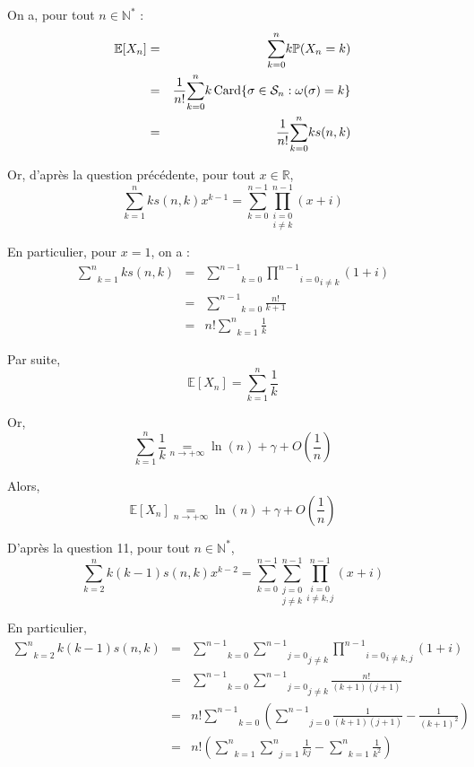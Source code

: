  On a, pour tout $n \in \mathbb{N}^{\ast}$ :
\begin{eqnarray*}
  \mathbb{E} [X_n] & = & \underset{k = 0}{\overset{n}{\sum}} k\mathbb{P} (X_n
  = k)\\
  & = & \frac{1}{n!} \underset{k = 0}{\overset{n}{\sum}} k \operatorname{Card} \{
  \sigma \in \mathcal{S}_n : \omega (\sigma) = k \}\\
  & = & \frac{1}{n!} \underset{k = 0}{\overset{n}{\sum}} k s (n, k)
\end{eqnarray*}


Or, d'apr{\`e}s la question pr{\'e}c{\'e}dente, pour tout $x \in \mathbb{R}$,
\[ \underset{k = 1}{\overset{n}{\sum}} k s (n, k) x^{k - 1} = \underset{k =
   0}{\overset{n - 1}{\sum}} \underset{i \neq k}{\underset{i = 0}{\overset{n -
   1}{\prod}}} (x + i) \]


En particulier, pour $x = 1$, on a :
\begin{eqnarray*}
  \underset{k = 1}{\overset{n}{\sum}} k s (n, k) & = & \underset{k =
  0}{\overset{n - 1}{\sum}} \underset{i \neq k}{\underset{i = 0}{\overset{n -
  1}{\prod}}} (1 + i)\\
  & = & \underset{k = 0}{\overset{n - 1}{\sum}} \frac{n!}{k + 1}\\
  & = & n! \underset{k = 1}{\overset{n}{\sum}} \frac{1}{k}
\end{eqnarray*}


Par suite,
\[ \mathbb{E} [X_n] = \underset{k = 1}{\overset{n}{\sum}} \frac{1}{k} \]


Or,
\[ \underset{k = 1}{\overset{n}{\sum}} \frac{1}{k} \underset{n \rightarrow +
   \infty}{=} \ln (n) + \gamma + O \left( \frac{1}{n} \right) \]


Alors,
\[ \mathbb{E} [X_n] \underset{n \rightarrow + \infty}{=} \ln (n) + \gamma + O
   \left( \frac{1}{n} \right) \]


 D'apr{\`e}s la question 11, pour tout $n \in
\mathbb{N}^{\ast}$,
\[ \underset{k = 2}{\overset{n}{\sum}} k (k - 1) s (n, k) x^{k - 2} =
   \underset{k = 0}{\overset{n - 1}{\sum}} \underset{j \neq k}{\underset{j =
   0}{\overset{n - 1}{\sum}}} \underset{i \neq k, j}{\underset{i =
   0}{\overset{n - 1}{\prod}}} (x + i) \]


En particulier,
\begin{eqnarray*}
  \underset{k = 2}{\overset{n}{\sum}} k (k - 1) s (n, k) & = & \underset{k =
  0}{\overset{n - 1}{\sum}} \underset{j \neq k}{\underset{j = 0}{\overset{n -
  1}{\sum}}} \underset{i \neq k, j}{\underset{i = 0}{\overset{n - 1}{\prod}}}
  (1 + i)\\
  & = & \underset{k = 0}{\overset{n - 1}{\sum}} \underset{j \neq
  k}{\underset{j = 0}{\overset{n - 1}{\sum}}} \frac{n!}{(k + 1)  (j + 1)}\\
  & = & n! \underset{k = 0}{\overset{n - 1}{\sum}} \left( \underset{j =
  0}{\overset{n - 1}{\sum}} \frac{1}{(k + 1)  (j + 1)} - \frac{1}{(k + 1)^2}
  \right)\\
  & = & n! \left( \underset{k = 1}{\overset{n}{\sum}} \underset{j =
  1}{\overset{n}{\sum}} \frac{1}{k j} - \underset{k = 1}{\overset{n}{\sum}}
  \frac{1}{k^2} \right)
\end{eqnarray*}


